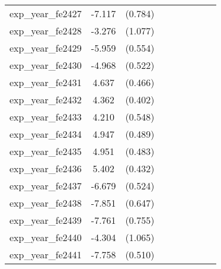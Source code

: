 {\begin{tabular}{l*{4}{cc}}
exp\_year\_fe2427&   -7.117\sym{***}&  (0.784)&                  &         &                  &         &                  &         \\
exp\_year\_fe2428&   -3.276\sym{**} &  (1.077)&                  &         &                  &         &                  &         \\
exp\_year\_fe2429&   -5.959\sym{***}&  (0.554)&                  &         &                  &         &                  &         \\
exp\_year\_fe2430&   -4.968\sym{***}&  (0.522)&                  &         &                  &         &                  &         \\
exp\_year\_fe2431&    4.637\sym{***}&  (0.466)&                  &         &                  &         &                  &         \\
exp\_year\_fe2432&    4.362\sym{***}&  (0.402)&                  &         &                  &         &                  &         \\
exp\_year\_fe2433&    4.210\sym{***}&  (0.548)&                  &         &                  &         &                  &         \\
exp\_year\_fe2434&    4.947\sym{***}&  (0.489)&                  &         &                  &         &                  &         \\
exp\_year\_fe2435&    4.951\sym{***}&  (0.483)&                  &         &                  &         &                  &         \\
exp\_year\_fe2436&    5.402\sym{***}&  (0.432)&                  &         &                  &         &                  &         \\
exp\_year\_fe2437&   -6.679\sym{***}&  (0.524)&                  &         &                  &         &                  &         \\
exp\_year\_fe2438&   -7.851\sym{***}&  (0.647)&                  &         &                  &         &                  &         \\
exp\_year\_fe2439&   -7.761\sym{***}&  (0.755)&                  &         &                  &         &                  &         \\
exp\_year\_fe2440&   -4.304\sym{***}&  (1.065)&                  &         &                  &         &                  &         \\
exp\_year\_fe2441&   -7.758\sym{***}&  (0.510)&                  &         &                  &         &                  &         \\

\end{tabular}}
